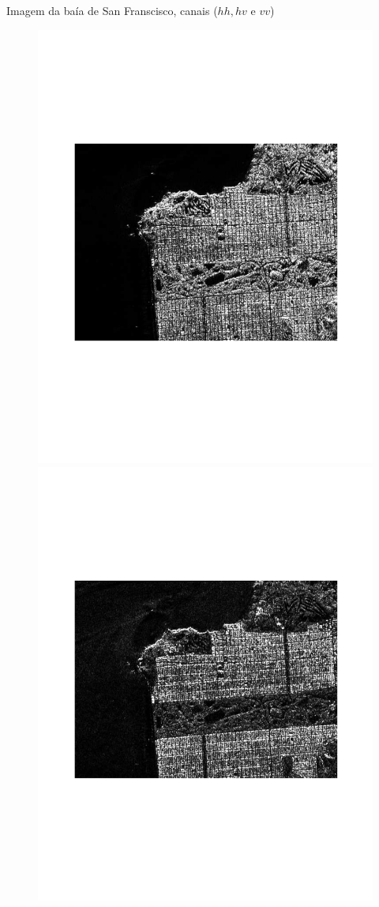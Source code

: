 \documentclass[10pt]{beamer}
\begin{document}
\begin{frame}{Imagem da baía de San Franscisco, canais ($hh, hv$ e $vv$)}
\begin{figure}[hbt]
	\includegraphics[width=\linewidth]{sf_vh.pdf}
\endminipage
{}
	\includegraphics[width=\linewidth]{sf_vv.pdf}

\end{figure}
\end{frame}
\end{document}
